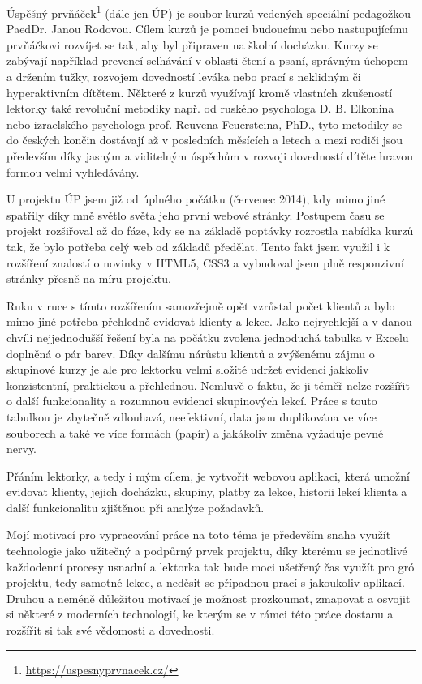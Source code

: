 Úspěšný prvňáček\footnote{\url{https://uspesnyprvnacek.cz/}} (dále jen ÚP) je soubor kurzů vedených speciální pedagožkou PaedDr. Janou Rodovou. Cílem kurzů je pomoci budoucímu nebo nastupujícímu prvňáčkovi rozvíjet se tak, aby byl připraven na školní docházku. Kurzy se zabývají například prevencí selhávání v oblasti čtení a psaní, správným úchopem a držením tužky, rozvojem dovedností leváka nebo prací s neklidným či hyperaktivním dítětem. Některé z kurzů využívají kromě vlastních zkušeností lektorky také revoluční metodiky např. od ruského psychologa D. B. Elkonina nebo izraelského psychologa prof. Reuvena Feuersteina, PhD., tyto metodiky se do českých končin dostávají až v posledních měsících a letech a mezi rodiči jsou především díky jasným a viditelným úspěchům v rozvoji dovedností dítěte hravou formou velmi vyhledávány.

U projektu ÚP jsem již od úplného počátku (červenec 2014), kdy mimo jiné spatřily díky mně světlo světa jeho první webové stránky. Postupem času se projekt rozšiřoval až do fáze, kdy se na základě poptávky rozrostla nabídka kurzů tak, že bylo potřeba celý web od základů předělat. Tento fakt jsem využil i k rozšíření znalostí o novinky v HTML5, CSS3 a vybudoval jsem plně responzivní stránky přesně na míru projektu.

Ruku v ruce s tímto rozšířením samozřejmě opět vzrůstal počet klientů a bylo mimo jiné potřeba přehledně evidovat klienty a lekce. Jako nejrychlejší a v danou chvíli nejjednodušší řešení byla na počátku zvolena jednoduchá tabulka v Excelu doplněná o pár barev. Díky dalšímu nárůstu klientů a zvýšenému zájmu o skupinové kurzy je ale pro lektorku velmi složité udržet evidenci jakkoliv konzistentní, praktickou a přehlednou. Nemluvě o faktu, že ji téměř nelze rozšířit o další funkcionality a rozumnou evidenci skupinových lekcí. Práce s touto tabulkou je zbytečně zdlouhavá, neefektivní, data jsou duplikována ve více souborech a také ve více formách (papír) a jakákoliv změna vyžaduje pevné nervy.

Přáním lektorky, a tedy i mým cílem, je vytvořit webovou aplikaci, která umožní evidovat klienty, jejich docházku, skupiny, platby za lekce, historii lekcí klienta a další funkcionalitu zjištěnou při analýze požadavků.

Mojí motivací pro vypracování práce na toto téma je především snaha využít technologie jako užitečný a podpůrný prvek projektu, díky kterému se jednotlivé každodenní procesy usnadní a lektorka tak bude moci ušetřený čas využít pro gró projektu, tedy samotné lekce, a neděsit se případnou prací s jakoukoliv aplikací. Druhou a neméně důležitou motivací je možnost prozkoumat, zmapovat a osvojit si některé z moderních technologií, ke kterým se v rámci této práce dostanu a rozšířit si tak své vědomosti a dovednosti.

